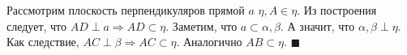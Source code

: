Рассмотрим плоскость перпендикуляров прямой $a$ $\eta, A\in \eta$. Из построения следует, что $AD\perp a \Rightarrow AD\subset \eta$. Заметим, что $a \subset \alpha, \beta$. А значит, что $\alpha, \beta \perp \eta$. Как следствие, $AC\perp \beta \Rightarrow AC \subset \eta$. Аналогично $AB \subset \eta$. $\blacksquare$